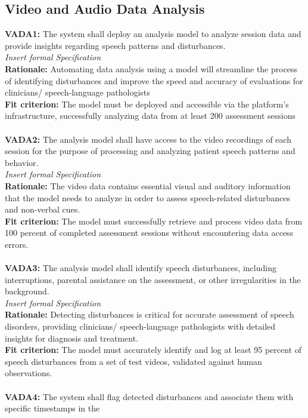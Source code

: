 \documentclass[12pt]{article}
\begin{document}
\subsection{Video and Audio Data Analysis}
\textbf{VADA1: } The system shall deploy an analysis model to analyze session data and provide insights regarding
 speech patterns and disturbances.\\
\textit{Insert formal Specification}\\
\textbf{Rationale: } Automating data analysis using a model will streamline the process of identifying disturbances
 and improve the speed and accuracy of evaluations for clinicians/ speech-language pathologists\\
\textbf{Fit criterion: } The model must be deployed and accessible via the platform's infrastructure, 
successfully analyzing data from at least 200 assessment sessions\\\\
\textbf{VADA2: } The analysis model shall have access to the video recordings of each session for the purpose of
 processing and analyzing patient speech patterns and behavior.\\
\textit{Insert formal Specification}\\
\textbf{Rationale: } The video data contains essential visual and auditory information that the model needs to 
analyze in order to assess speech-related disturbances and non-verbal cues.\\
\textbf{Fit criterion: }The model must successfully retrieve and process video data from 100 percent of 
completed assessment sessions without encountering data access errors.\\\\
\textbf{VADA3: } The analysis model shall identify speech disturbances, including interruptions, parental 
assistance on the assessment, or other irregularities in the background.\\
\textit{Insert formal Specification}\\
\textbf{Rationale: } Detecting disturbances is critical for accurate assessment of speech disorders,
 providing clinicians/ speech-language pathologists with detailed insights for diagnosis and treatment.\\
\textbf{Fit criterion: } The model must accurately identify and log at least 95 percent of speech disturbances 
from a set of test videos, validated against human observations.\\\\
\textbf{VADA4: } The system shall flag detected disturbances and associate them with specific timestamps in the 
\end{document}
